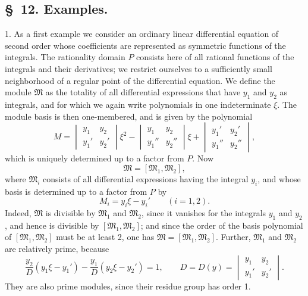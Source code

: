 \documentclass[11pt]{article}
\begin{document}
\subsection*{\S~12. Examples.}

1. As a first example we consider an ordinary linear differential equation of second order whose coefficients are represented as symmetric functions of the integrals. The rationality domain $P$ consists here of all rational functions of the integrals and their derivatives; we restrict ourselves to a sufficiently small neighborhood of a regular point of the differential equation. We define the module $\mathfrak M$ as the totality of all differential expressions that have $y_1$ and $y_2$ as integrals, and for which we again write polynomials in one indeterminate $\xi$. The module basis is then one-membered, and is given by the polynomial
\[
 M=
 \begin{vmatrix} y_1&y_2\\ y_1'&y_2'\end{vmatrix}\xi^2
 -\begin{vmatrix} y_1&y_2\\ y_1''&y_2''\end{vmatrix}\xi
 +\begin{vmatrix} y_1'&y_2'\\ y_1''&y_2''\end{vmatrix},
\]
which is uniquely determined up to a factor from $P$. Now
\begin{equation}
 \mathfrak M=[\mathfrak M_1,
\mathfrak M_2],
\tag{41}
\end{equation}
where $\mathfrak M_i$ consists of all differential expressions having the integral $y_i$, and whose basis is determined up to a factor from $P$ by
\[
 M_i=y_i\xi-y_i'
 \qquad(i=1,2).
\]
Indeed, $\mathfrak M$ is divisible by $\mathfrak M_1$ and $\mathfrak M_2$, since it vanishes for the integrals $y_1$ and $y_2$, and hence is divisible by $[\mathfrak M_1,
\mathfrak M_2]$; and since the order of the basis polynomial of $[\mathfrak M_1,
\mathfrak M_2]$ must be at least 2, one has $\mathfrak M=[\mathfrak M_1,
\mathfrak M_2]$. Further, $\mathfrak M_1$ and $\mathfrak M_2$ are relatively prime, because
\begin{equation}
 \frac{y_2}{D}(y_1\xi-y_1')-\frac{y_1}{D}(y_2\xi-y_2')=1,
 \qquad
 D=D(y)=\begin{vmatrix}y_1&y_2\\ y_1'&y_2'\end{vmatrix}.
\tag{42}
\end{equation}
They are also prime modules, since their residue group has order 1.
\end{document}
